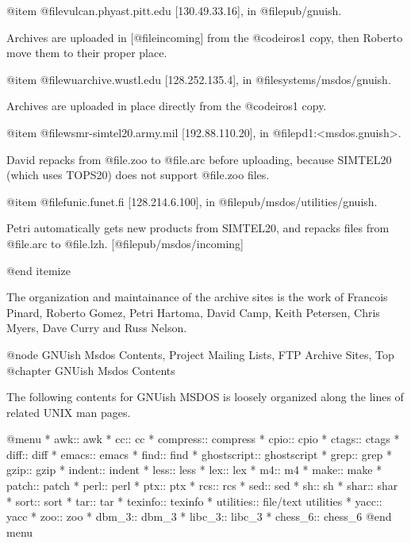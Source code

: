 @item
@file{vulcan.phyast.pitt.edu} [130.49.33.16], in @file{pub/gnuish}.

Archives are uploaded in [@file{incoming}] from the @code{iros1} copy,
then Roberto move them to their proper place.

@item
@file{wuarchive.wustl.edu} [128.252.135.4], in @file{systems/msdos/gnuish}.

Archives are uploaded in place directly from the @code{iros1} copy.

@item
@file{wsmr-simtel20.army.mil} [192.88.110.20], in @file{pd1:<msdos.gnuish>}.

David repacks from @file{.zoo} to @file{.arc} before uploading, because
SIMTEL20 (which uses TOPS20) does not support @file{.zoo} files.

@item
@file{funic.funet.fi} [128.214.6.100], in @file{pub/msdos/utilities/gnuish}.

Petri automatically gets new products from SIMTEL20, and repacks files
from @file{.arc} to @file{.lzh}.  [@file{pub/msdos/incoming}]

@end itemize

The organization and maintainance of the archive sites is the work of
Francois Pinard, Roberto Gomez, Petri Hartoma, David Camp, Keith
Petersen, Chris Myers, Dave Curry and Russ Nelson.


@node GNUish Msdos Contents, Project Mailing Lists, FTP Archive Sites, Top
@chapter GNUish Msdos Contents

The following contents for GNUish MSDOS is loosely organized along the
lines of related UNIX man pages.

@menu
* awk::                         awk
* cc::                          cc
* compress::                    compress
* cpio::                        cpio
* ctags::                       ctags
* diff::                        diff
* emacs::                       emacs
* find::                        find
* ghostscript::                 ghostscript
* grep::                        grep
* gzip::                        gzip
* indent::                      indent
* less::                        less
* lex::                         lex
* m4::                          m4
* make::                        make
* patch::                       patch
* perl::                        perl
* ptx::                         ptx
* rcs::                         rcs
* sed::                         sed
* sh::                          sh
* shar::                        shar
* sort::                        sort
* tar::                         tar
* texinfo::                     texinfo
* utilities::                   file/text utilities
* yacc::                        yacc
* zoo::                         zoo
* dbm_3::                       dbm_3
* libc_3::                      libc_3
* chess_6::                     chess_6
@end menu

